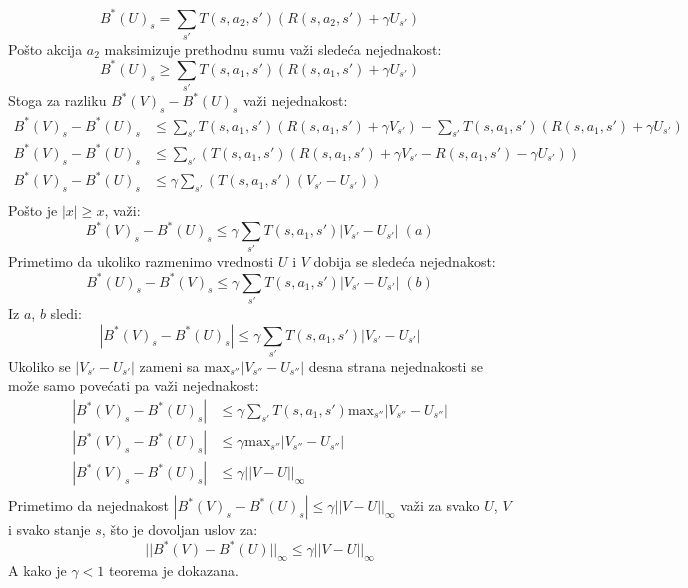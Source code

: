 \documentclass[a4paper,fleqn,12pt]{JMThesis}
\theoremstyle{plain}
\theoremstyle{definition}
\theoremstyle{definition}
\begin{document}
\[	B^*(U)_s = \sum_{s'}T(s,a_2,s')(R(s,a_2,s')+\gamma U_{s'}) \]
Pošto akcija $a_2$ maksimizuje prethodnu sumu važi sledeća nejednakost:
\[	B^*(U)_s \geq \sum_{s'}T(s,a_1,s')(R(s,a_1,s')+\gamma U_{s'}) \]
Stoga za razliku $B^*(V)_s - B^*(U)_s$ važi nejednakost:
\[ 
	\begin{split}
		B^*(V)_s - B^*(U)_s &\leq \sum_{s'}T(s,a_1,s')(R(s,a_1,s')+\gamma V_{s'}) - \sum_{s'}T(s,a_1,s')(R(s,a_1,s')+\gamma U_{s'})\\
		B^*(V)_s - B^*(U)_s &\leq \sum_{s'}(T(s,a_1,s')(R(s,a_1,s') + \gamma V_{s'} - R(s,a_1,s') - \gamma U_{s'}))\\
		B^*(V)_s - B^*(U)_s &\leq \gamma \sum_{s'}(T(s,a_1,s')(V_{s'} - U_{s'}))\\
	\end{split}
\]
Pošto je $|x| \geq x$, važi:
\[B^*(V)_s - B^*(U)_s \leq \gamma \sum_{s'}T(s,a_1,s')|V_{s'} - U_{s'}| \; (a)\]
Primetimo da ukoliko razmenimo vrednosti $U$ i $V$ dobija se sledeća nejednakost:
\[ B^*(U)_s - B^*(V)_s \leq \gamma \sum_{s'}T(s,a_1,s')|V_{s'} - U_{s'}| \; (b)\]
Iz $a$, $b$ sledi:
\[ |B^*(V)_s - B^*(U)_s| \leq \gamma \sum_{s'}T(s,a_1,s')|V_{s'} - U_{s'}| \] 
Ukoliko se $|V_{s'} - U_{s'}|$ zameni sa $\text{max}_{s''}|V_{s''} - U_{s''}|$ desna strana nejednakosti se može
samo povećati pa važi nejednakost:
\[ 
	\begin{split}
		|B^*(V)_s - B^*(U)_s| &\leq \gamma \sum_{s'}T(s,a_1,s')\text{max}_{s''}|V_{s''} - U_{s''}|\\
		|B^*(V)_s - B^*(U)_s| &\leq \gamma \text{max}_{s''}|V_{s''} - U_{s''}|\\
		|B^*(V)_s - B^*(U)_s| &\leq \gamma ||V - U||_{\infty}\\
	\end{split}
\] 
Primetimo da nejednakost $|B^*(V)_s - B^*(U)_s| \leq \gamma ||V - U||_{\infty}$ važi za svako $U$, $V$ 
i svako stanje $s$, što je dovoljan uslov za:
\[
	||B^*(V) - B^*(U)||_{\infty} \leq \gamma ||V - U||_{\infty}
\]
A kako je $\gamma < 1$ teorema je dokazana.
\end{document}
